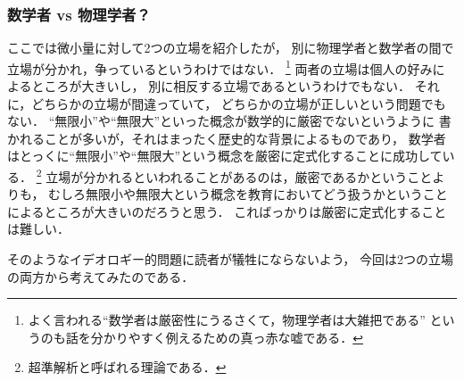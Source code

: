 \subsubsection{数学者 vs 物理学者？}
ここでは微小量に対して2つの立場を紹介したが，
別に物理学者と数学者の間で立場が分かれ，争っているというわけではない．
\footnote{よく言われる``数学者は厳密性にうるさくて，物理学者は大雑把である''
というのも話を分かりやすく例えるための真っ赤な嘘である．}
両者の立場は個人の好みによるところが大きいし，
別に相反する立場であるというわけでもない．
それに，どちらかの立場が間違っていて，
どちらかの立場が正しいという問題でもない．
``無限小''や``無限大''といった概念が数学的に厳密でないというように
書かれることが多いが，それはまったく歴史的な背景によるものであり，
数学者はとっくに``無限小''や``無限大''という概念を厳密に定式化することに成功している．
\footnote{超準解析と呼ばれる理論である．}
立場が分かれるといわれることがあるのは，厳密であるかということよりも，
むしろ無限小や無限大という概念を教育においてどう扱うかということによるところが大きいのだろうと思う．
こればっかりは厳密に定式化することは難しい．

そのようなイデオロギー的問題に読者が犠牲にならないよう，
今回は2つの立場の両方から考えてみたのである．
